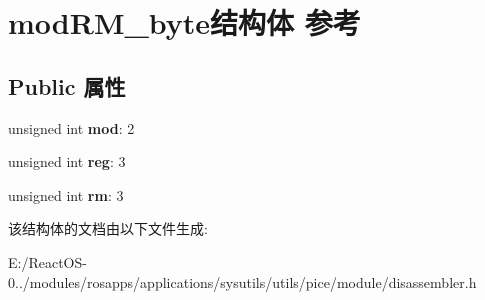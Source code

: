 \hypertarget{structmod_r_m__byte}{}\section{mod\+R\+M\+\_\+byte结构体 参考}
\label{structmod_r_m__byte}
\subsection*{Public 属性}
\begin{DoxyCompactItemize}
\item 
\mbox{\label{structmod_r_m__byte_adc12bac32c6b62b8cd8921e762a34d11}} 
unsigned int {\bfseries mod}\+: 2
\item 
\mbox{\label{structmod_r_m__byte_a7174c22580c72a8f44d2860f5d5c4d4a}} 
unsigned int {\bfseries reg}\+: 3
\item 
\mbox{\label{structmod_r_m__byte_ae678d528619044302d814a4853133f2c}} 
unsigned int {\bfseries rm}\+: 3
\end{DoxyCompactItemize}


该结构体的文档由以下文件生成\+:\begin{DoxyCompactItemize}
\item 
E\+:/\+React\+O\+S-\/0../modules/rosapps/applications/sysutils/utils/pice/module/disassembler.\+h\end{DoxyCompactItemize}
